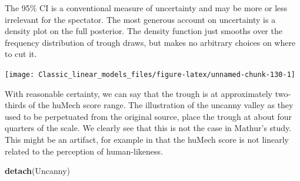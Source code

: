 \documentclass[]{svmono}
\newenvironment{Shaded}{\begin{snugshade}}{\end{snugshade}}
\newcommand{\KeywordTok}[1]{\textcolor[rgb]{0.13,0.29,0.53}{\textbf{#1}}}
\newcommand{\DataTypeTok}[1]{\textcolor[rgb]{0.13,0.29,0.53}{#1}}
\newcommand{\DecValTok}[1]{\textcolor[rgb]{0.00,0.00,0.81}{#1}}
\newcommand{\StringTok}[1]{\textcolor[rgb]{0.31,0.60,0.02}{#1}}
\newcommand{\OperatorTok}[1]{\textcolor[rgb]{0.81,0.36,0.00}{\textbf{#1}}}
\newcommand{\NormalTok}[1]{#1}
\begin{document}
The 95\% CI is a conventional measure of uncertainty and may be more or
less irrelevant for the spectator. The most generous account on
uncertainty is a density plot on the full posterior. The density
function just smooths over the frequency distribution of trough draws,
but makes no arbitrary choices on where to cut it.

\begin{Shaded}
\end{Shaded}

\texttt{[image: Classic\_linear\_models\_files/figure-latex/unnamed-chunk-130-1]}

With reasonable certainty, we can say that the trough is at
approximately two-thirds of the huMech score range. The illustration of
the uncanny valley as they used to be perpetuated from the original
source, place the trough at about four quarters of the scale. We clearly
see that this is not the case in Mathur's study. This might be an
artifact, for example in that the huMech score is not linearly related
to the perception of human-likeness.

\begin{Shaded}
\begin{Highlighting}[]
\KeywordTok{detach}\NormalTok{(Uncanny)}
\end{Highlighting}
\end{Shaded}
\end{document}
